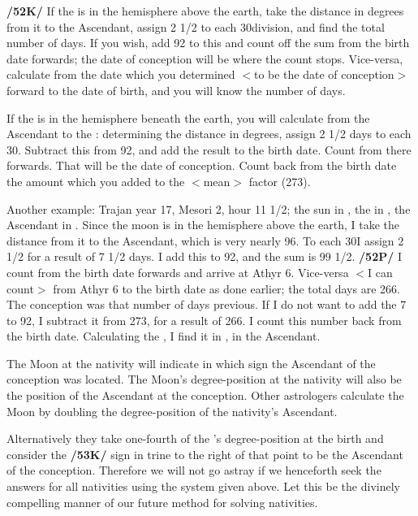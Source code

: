 \textbf{/52K/} If the \Moon\xspace is in the hemisphere above the earth, take the distance in degrees from it to the
Ascendant, assign 2 1/2 to each 30\deg division, and find the total number of days. If you wish, add 92 to this and count off the sum from the birth date forwards; the date of conception will be where the count stops. Vice-versa, calculate from the date which you determined $<$to be the date of conception$>$ forward to the date of birth, and you will know the number of days. 

If the \Moon\xspace is in the hemisphere beneath the earth, you will calculate from the Ascendant to the \Moon: determining the distance in degrees, assign 2 1/2 days to each 30\deg. Subtract this from 92, and add the result to the birth date. Count from there forwards. That will be the date of conception. Count back from the birth date the amount which you added to the $<$mean$>$ factor (273).

Another example: Trajan year 17, Mesori 2, hour 11 1/2; the sun in \Leo\xspace 5\deg, the \Moon\xspace in \Libra\xspace 26\deg, the Ascendant in \Capricorn\xspace 24\deg. Since the moon is in the hemisphere above the earth, I take the distance
from it to the Ascendant, which is very nearly 96\deg. To each 30\deg I assign 2 1/2 for a result of 7 1/2 days. I add this to 92, and the sum is 99 1/2. \textbf{/52P/} I count from the birth date forwards and arrive at Athyr 6. Vice-versa $<$I can count$>$ from Athyr 6 to the birth date as done earlier; the total days are 266. The conception was that number of days previous. If I do not want to add the 7 to 92, I subtract it from 273, for a result of 266. I count this number back from the birth date. Calculating the \Moon, I find it in
\Capricorn, in the Ascendant.

The Moon at the nativity will indicate in which sign the Ascendant of the conception was located. The Moon’s degree-position at the nativity will also be the position of the Ascendant at the conception. Other astrologers calculate the Moon by doubling the degree-position of the nativity’s Ascendant.

Alternatively they take one-fourth of the \Sun’s degree-position at the birth and consider the \textbf{/53K/} sign in
trine to the right of that point to be the Ascendant of the conception. Therefore we will not go astray if we henceforth seek the answers for all nativities using the system given above. Let this be the divinely compelling manner of our future method for solving nativities.

\newpage